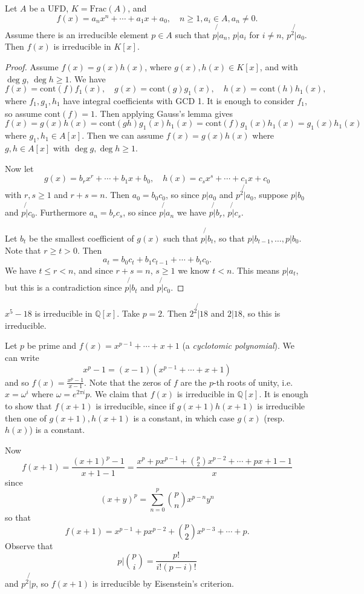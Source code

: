 \begin{theorem}
Let $A$ be a UFD, $K = \mathrm{Frac}(A)$, and
$$
f(x) = a_n x^n + \cdots + a_1 x + a_0, \quad
n \geq 1, a_i \in A, a_n \neq 0.
$$
Assume there is an irreducible element $p \in A$ such that
$p \not{\vert} a_n$, $p \vert a_i$ for $i \neq n$, $p^2 \not{\vert}
a_0$. Then $f(x)$ is irreducible in $K[x]$.
\end{theorem}
\begin{proof}
Assume $f(x) = g(x) h(x)$, where $g(x), h(x) \in K[x]$, and with
$\deg g$, $\deg h \geq 1$. We have
$$
f(x) = \mathrm{cont}(f) f_1(x), \quad
g(x) = \mathrm{cont}(g) g_1(x), \quad
h(x) = \mathrm{cont}(h) h_1(x),
$$
where $f_1, g_1, h_1$ have integral coefficients with GCD 1.
It is enough to consider $f_1$, so assume $\mathrm{cont}(f) = 1$. Then
applying Gauss's lemma gives
$$
  f(x)
= g(x)h(x)
= \mathrm{cont}(gh) g_1(x) h_1(x)
= \mathrm{cont}(f) g_1(x) h_1(x)
= g_1(x) h_1(x)
$$
where $g_1, h_1 \in A[x]$. Then we can assume
$f(x) = g(x) h(x)$ where $g, h \in A[x]$ with
$\deg g, \deg h \geq 1$.

Now let
$$
g(x) = b_r x^r + \cdots + b_1 x + b_0, \quad
h(x) = c_s x^s + \cdots + c_1 x + c_0
$$
with $r, s \geq 1$ and $r + s = n$. Then
$a_0 = b_0 c_0$, so since $p \vert a_0$ and
$p^2 \not{\vert} a_0$, suppose $p \vert b_0$ and
$p \not{\vert} c_0$. Furthermore
$a_n = b_r c_s$, so since $p \not{\vert} a_n$ we have
$p \not{\vert} b_r$, $p \not{\vert} c_s$.

Let $b_t$ be the smallest coefficient of $g(x)$ such that
$p \not{\vert} b_t$, so that
$p \vert b_{t-1}, \dots, p \vert b_0$. Note that
$r \geq t > 0$.
Then
$$
a_t = b_0 c_t + b_1 c_{t-1} + \cdots + b_t c_0.
$$
We have $t \leq r < n$, and since $r + s = n$, $s \geq 1$
we know $t < n$. This means $p \vert a_t$, but this is a contradiction
since $p \not{\vert} b_t$ and $p \not{\vert} c_0$.
\end{proof}

\begin{xmpl}
$x^5 - 18$ is irreducible in $\mathbb{Q}[x]$. Take
$p = 2$. Then $2^2 \not{\vert} 18$ and $2 \vert 18$, so this is
irreducible.

Let $p$ be prime and
$f(x) = x^{p-1} + \cdots + x + 1$ (a \emph{cyclotomic polynomial}).
We can write
$$
x^p - 1 = (x - 1)(x^{p-1} + \cdots + x + 1)
$$
and so $f(x) = \frac{x^p - 1}{x - 1}$. Note that the zeros of $f$
are the $p$-th roots of unity, i.e. $x = \omega^i$ where
$\omega = e^{2\pi i}{p}$. We claim that $f(x)$ is irreducible in
$\mathbb{Q}[x]$. It is enough to show that $f(x + 1)$ is irreducible,
since if $g(x + 1)h(x + 1)$ is irreducible then one of $g(x+1),
h(x+1)$ is a constant, in which case $g(x)$ (resp. $h(x)$) is a
constant.

Now
$$
  f(x + 1)
= \frac{(x + 1)^p - 1}{x + 1 - 1}
= \frac{x^p + p x^{p-1} + {p \choose 2} x^{p-2} + \cdots + p x + 1 - 1}{x}
$$
since
$$
(x + y)^p = \sum_{n=0}^p {p \choose n} x^{p-n} y^n
$$
so that
$$
f(x + 1) = x^{p-1} + p x^{p-2} + {p \choose 2} x^{p-3} + \cdots + p.
$$
Observe that
$$
p \vert {p \choose i} = \frac{p!}{i!(p-i)!}
$$
and $p^2 \not{\vert} p$, so $f(x+1)$ is irreducible by Eisenstein's criterion.
\end{xmpl}

